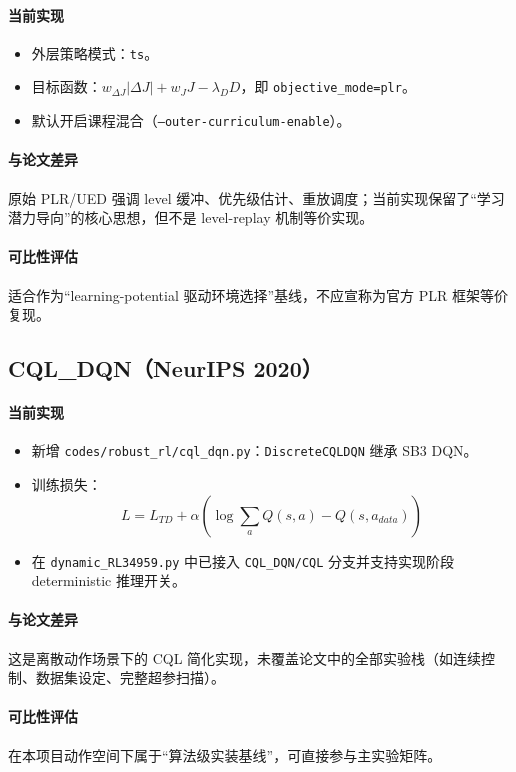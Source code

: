 ﻿\documentclass[12pt,a4paper]{ctexart}
\begin{document}
\paragraph{当前实现}
\begin{itemize}
  \item 外层策略模式：\texttt{ts}。
  \item 目标函数：\( w_{\Delta J}|\Delta J| + w_J J - \lambda_D D \)，即 \texttt{objective\_mode=plr}。
  \item 默认开启课程混合（\texttt{--outer-curriculum-enable}）。
\end{itemize}

\paragraph{与论文差异}
原始 PLR/UED 强调 level 缓冲、优先级估计、重放调度；当前实现保留了“学习潜力导向”的核心思想，但不是 level-replay 机制等价实现。

\paragraph{可比性评估}
适合作为“learning-potential 驱动环境选择”基线，不应宣称为官方 PLR 框架等价复现。

\subsection{CQL\_DQN（NeurIPS 2020）}
\paragraph{当前实现}
\begin{itemize}
  \item 新增 \texttt{codes/robust\_rl/cql\_dqn.py}：\texttt{DiscreteCQLDQN} 继承 SB3 DQN。
  \item 训练损失：
  \[
  L = L_{TD} + \alpha \left(\log\sum_a Q(s,a) - Q(s,a_{data})\right)
  \]
  \item 在 \texttt{dynamic\_RL34959.py} 中已接入 \texttt{CQL\_DQN/CQL} 分支并支持实现阶段 deterministic 推理开关。
\end{itemize}

\paragraph{与论文差异}
这是离散动作场景下的 CQL 简化实现，未覆盖论文中的全部实验栈（如连续控制、数据集设定、完整超参扫描）。

\paragraph{可比性评估}
在本项目动作空间下属于“算法级实装基线”，可直接参与主实验矩阵。
\end{document}
